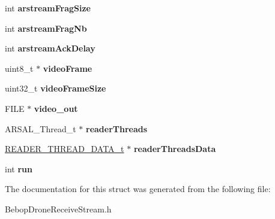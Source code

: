 \begin{DoxyCompactItemize}
\item 
\hypertarget{structBD__MANAGER__t_a13d8ac846cffaef4278ee721d2533ea2}{}int {\bfseries arstream\+Frag\+Size}\label{structBD__MANAGER__t_a13d8ac846cffaef4278ee721d2533ea2}

\item 
\hypertarget{structBD__MANAGER__t_a5960ea0c7fb6a963503208d359351c35}{}int {\bfseries arstream\+Frag\+Nb}\label{structBD__MANAGER__t_a5960ea0c7fb6a963503208d359351c35}

\item 
\hypertarget{structBD__MANAGER__t_af1f5ce80cd4b602990108c07d7bc8878}{}int {\bfseries arstream\+Ack\+Delay}\label{structBD__MANAGER__t_af1f5ce80cd4b602990108c07d7bc8878}

\item 
\hypertarget{structBD__MANAGER__t_a525cf5746b18a94ee39b7c38d2eee852}{}uint8\+\_\+t $\ast$ {\bfseries video\+Frame}\label{structBD__MANAGER__t_a525cf5746b18a94ee39b7c38d2eee852}

\item 
\hypertarget{structBD__MANAGER__t_ac9a70352549d704065f93572ff02c774}{}uint32\+\_\+t {\bfseries video\+Frame\+Size}\label{structBD__MANAGER__t_ac9a70352549d704065f93572ff02c774}

\item 
\hypertarget{structBD__MANAGER__t_a6ef2f0ab25b4ec27a0db6e5b2d45f665}{}F\+I\+L\+E $\ast$ {\bfseries video\+\_\+out}\label{structBD__MANAGER__t_a6ef2f0ab25b4ec27a0db6e5b2d45f665}

\item 
\hypertarget{structBD__MANAGER__t_aa3b7db68f7f44df515ef261d3875fb70}{}A\+R\+S\+A\+L\+\_\+\+Thread\+\_\+t $\ast$ {\bfseries reader\+Threads}\label{structBD__MANAGER__t_aa3b7db68f7f44df515ef261d3875fb70}

\item 
\hypertarget{structBD__MANAGER__t_a8e51ed4fdf0e0bd52030fef9b6c44da2}{}\hyperlink{structREADER__THREAD__DATA__t}{R\+E\+A\+D\+E\+R\+\_\+\+T\+H\+R\+E\+A\+D\+\_\+\+D\+A\+T\+A\+\_\+t} $\ast$ {\bfseries reader\+Threads\+Data}\label{structBD__MANAGER__t_a8e51ed4fdf0e0bd52030fef9b6c44da2}

\item 
\hypertarget{structBD__MANAGER__t_a8a4ceedf2f1c86686f2144e797ec1152}{}int {\bfseries run}\label{structBD__MANAGER__t_a8a4ceedf2f1c86686f2144e797ec1152}

\end{DoxyCompactItemize}


The documentation for this struct was generated from the following file\+:\begin{DoxyCompactItemize}
\item 
Bebop\+Drone\+Receive\+Stream.\+h\end{DoxyCompactItemize}
